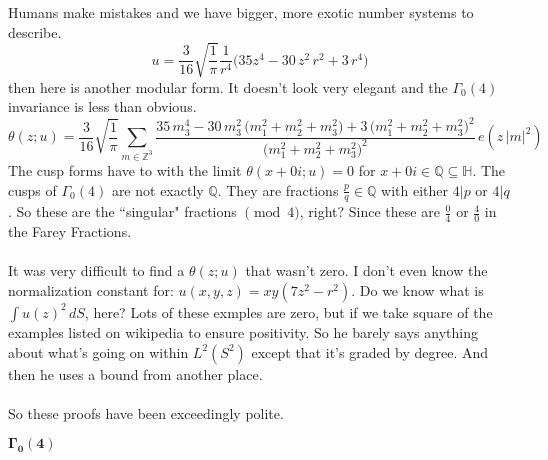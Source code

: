 \documentclass[12pt]{article}
\begin{document}
Humans make mistakes and we have bigger, more exotic number systems to describe.
$$ u = \frac{3}{16} \sqrt{\frac{1}{\pi}}  \frac{1}{r^4}\Big( 35z^4 - 30\, z^2 \, r^2 +3 \, r^4 \Big)$$
then here is another modular form.  It doesn't look very elegant and the $\Gamma_0(4)$ invariance is less than obvious.
$$ \theta(z;u) =  \frac{3}{16} \sqrt{\frac{1}{\pi}} \sum_{m \in \mathbb{Z}^3} \frac{35\,m_3^4 
- 30 \,m_3^2 \,\big(m_1^2 + m_2^2 + m_3^2\big) + 3 \,\big(m_1^2 + m_2^2 + m_3^2\big)^2 }{ \Big( m_1^2 + m_2^2 + m_3^2 \Big)^2} \, e(z\,|m|^2) $$
The cusp forms have to with the limit $\theta(x + 0i; u) = 0$ for $x + 0i\in \mathbb{Q}\subseteq \mathbb{H}$.  The cusps of $\Gamma_0(4)$ are not exactly $\mathbb{Q}$.  They are fractions $\frac{p}{q} \in \mathbb{Q}$ with either $4 | p $ or $4 | q$.   So these are the ``singular" fractions $\pmod 4$, right?  Since these are $\frac{0}{4}$ or $\frac{4}{0} $ in the Farey Fractions. \\ \\
It was very difficult to find a $\theta(z;u)$ that wasn't zero.  I don't even know the normalization constant for: $u(x,y,z) = xy (7z^2 - r^2) $.  Do we know what is $ \int u(z)^2 \, dS$, here?  Lots of these exmples are zero, but if we take square of the examples listed on wikipedia to ensure positivity.  So he barely says anything about what's going on within $L^2(S^2)$ except that it's graded by degree.  And then he uses a bound from another place. \\ \\
So these proofs have been exceedingly polite. \\

\fontsize{20}{15}\selectfont

\noindent $\mathbf{\Gamma_0(4)}$ \\

\fontsize{12.5}{12.5}\selectfont
\end{document}

